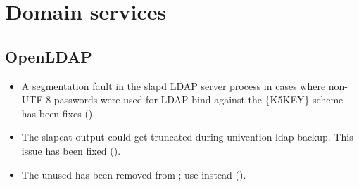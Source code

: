 \section{Domain services}

\subsection{OpenLDAP}
\begin{itemize}
\item A segmentation fault in the slapd LDAP server process in cases where
non-UTF-8 passwords were used for LDAP bind against the \{K5KEY\} scheme has
been fixes ().

\item The slapcat output could get truncated during univention-ldap-backup.
This issue has been fixed ().

\item The unused  has been removed from ; use  instead ().
\end{itemize}






